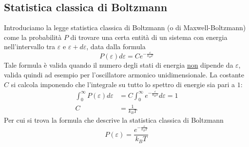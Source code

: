 \subsection{Statistica classica di Boltzmann}
Introduciamo la legge statistica classica di Boltzmann (o di Maxwell-Boltzmann) come la probabilità $P$ di trovare una certa entità di un sistema con energia nell'intervallo tra $\varepsilon$ e $\varepsilon+d\varepsilon$, data dalla formula
\begin{equation}
P(\varepsilon)d\varepsilon = C e^{ -\frac{\varepsilon}{k_BT } }
\end{equation}
Tale formula è valida quando il numero degli stati di energia \underline{non} dipende da $\varepsilon$, valida quindi ad esempio per l'oscillatore armonico unidimensionale.
La costante $C$ si calcola imponendo che l'integrale su tutto lo spettro di energie sia pari a $1$:
\begin{equation}
\begin{split}
\int_{0}^{\infty} P(\varepsilon) d\varepsilon & = C \int_{0}^{\infty} e^{ -\frac{\varepsilon}{k_BT } } d\varepsilon = 1 \\
C & = \frac{ 1}{k_BT }
\end{split}
\end{equation}
Per cui si trova la formula che descrive la statistica classica di Boltzmann 
\begin{equation}
P(\varepsilon) = \frac{ e^{ - \frac{\varepsilon}{k_BT } } }{k_BT }
\end{equation}


